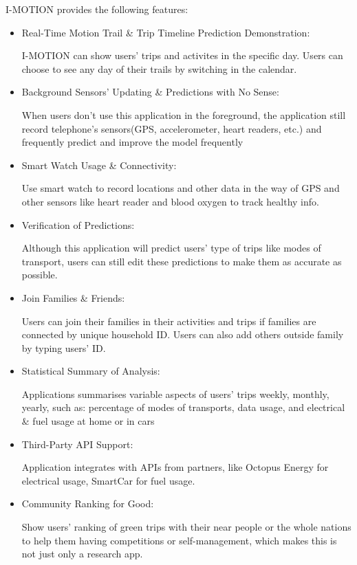 \documentclass[12pt,two side]{report}
\begin{document}
I-MOTION provides the following features:
\begin{itemize}
  \item Real-Time Motion Trail \& Trip Timeline Prediction Demonstration: 
  
  I-MOTION can show users' trips and activites in the specific day. Users can choose to see any day of their trails by switching in the calendar.
  
  \item Background Sensors' Updating \& Predictions with No Sense:

  When users don't use this application in the foreground, the application still record telephone's sensors(GPS, accelerometer, heart readers, etc.) and frequently predict and improve the model frequently
  
  \item Smart Watch Usage \& Connectivity:

  Use smart watch to record locations and other data in the way of GPS and other sensors like heart reader and blood oxygen to track healthy info.
  
  \item Verification of Predictions:

  Although this application will predict users' type of trips like modes of transport, users can still edit these predictions to make them as accurate as possible.
  
  \item Join Families \& Friends:

  Users can join their families in their activities and trips if families are connected by unique household ID. Users can also add others outside family by typing users' ID.

  \item Statistical Summary of Analysis:
  
  Applications summarises variable aspects of users' trips weekly, monthly, yearly, such as: percentage of modes of transports, data usage, and electrical \& fuel usage at home or in cars

  \item Third-Party API Support:

  Application integrates with APIs from partners, like Octopus Energy for electrical usage, SmartCar for fuel usage.

  \item Community Ranking for Good:

    Show users' ranking of green trips with their near people or the whole nations to help them having competitions or self-management, which makes this is not just only a research app.
  
  
\end{itemize}
\end{document}
